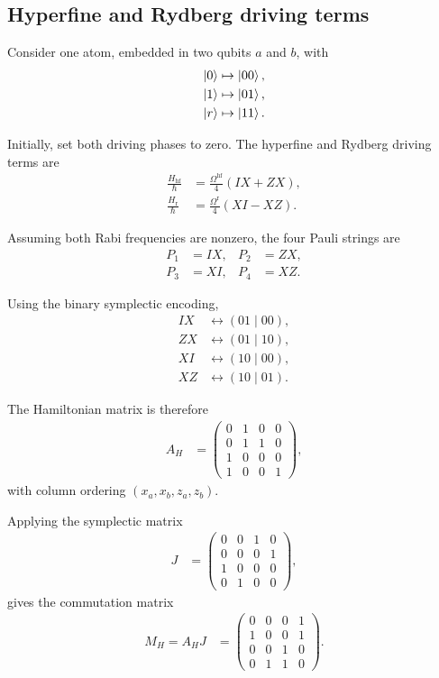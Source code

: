 \documentclass[amssymb,twocolumn,aps]{revtex4-2}
\begin{document}
\subsection*{Hyperfine and Rydberg driving terms}

Consider one atom, embedded in two qubits
$a$ and $b$, with
\begin{align*}
    \ket{0}&\mapsto\ket{00},\\
    \ket{1}&\mapsto\ket{01},\\
    \ket{r}&\mapsto\ket{11}.
\end{align*}

Initially, set both driving phases to zero.
The hyperfine and Rydberg driving terms are
\begin{align*}
    \frac{H_{\mathrm{hf}}}{\hbar}
    &=\frac{\Omega^{\mathrm{hf}}}{4}(IX+ZX),\\
    \frac{H_{\mathrm{r}}}{\hbar}
    &=\frac{\Omega^{\mathrm{r}}}{4}(XI-XZ).
\end{align*}

Assuming both Rabi frequencies are nonzero,
the four Pauli strings are
\begin{align*}
    P_1&=IX, &P_2&=ZX,\\
    P_3&=XI, &P_4&=XZ.
\end{align*}

Using the binary symplectic encoding,
\begin{align*}
    IX&\longleftrightarrow(01\mid00),\\
    ZX&\longleftrightarrow(01\mid10),\\
    XI&\longleftrightarrow(10\mid00),\\
    XZ&\longleftrightarrow(10\mid01).
\end{align*}

The Hamiltonian matrix is therefore
\begin{align*}
    A_H &=
    \begin{pmatrix}
        0&1&0&0\\
        0&1&1&0\\
        1&0&0&0\\
        1&0&0&1
    \end{pmatrix},
\end{align*}
with column ordering $(x_a,x_b,z_a,z_b)$.

Applying the symplectic matrix
\begin{align*}
    J &=
    \begin{pmatrix}
        0&0&1&0\\
        0&0&0&1\\
        1&0&0&0\\
        0&1&0&0
    \end{pmatrix},
\end{align*}
gives the commutation matrix
\begin{align*}
    M_H=A_HJ
    &=
    \begin{pmatrix}
        0&0&0&1\\
        1&0&0&1\\
        0&0&1&0\\
        0&1&1&0
    \end{pmatrix}.
\end{align*}
\end{document}
